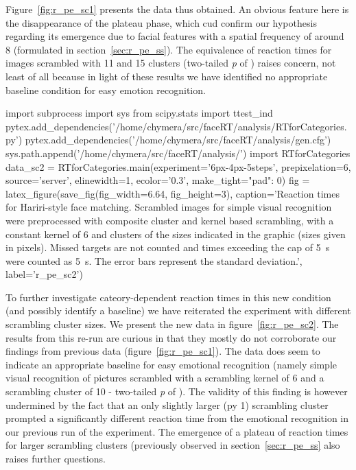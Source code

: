 	    Figure~\ref{fig:r_pe_sc1} presents the data thus obtained.
	    An obvious feature here is the disappearance of the plateau phase, which cud confirm our hypothesis regarding its emergence due to facial features with a spatial frequency of around \SI{8}{\pixel} (formulated in section~\ref{sec:r_pe_ss}).
	    The equivalence of reaction times for images scrambled with \SI{11}{\pixel} and \SI{15}{\pixel} clusters (two-tailed \textit{p} of ) raises concern, not least of all because in light of these results we have identified no appropriate baseline condition for easy emotion recognition.
	    \begin{pycode}
		import subprocess
		import sys
		from scipy.stats import ttest_ind
		pytex.add_dependencies('/home/chymera/src/faceRT/analysis/RTforCategories.py')
		pytex.add_dependencies('/home/chymera/src/faceRT/analysis/gen.cfg')
		sys.path.append('/home/chymera/src/faceRT/analysis/')
		import RTforCategories
		data_sc2 = RTforCategories.main(experiment='6px-4px-5steps', prepixelation=6, source='server', elinewidth=1, ecolor='0.3', make_tight={"pad": 0})
		fig = latex_figure(save_fig(fig_width=6.64, fig_height=3), caption='Reaction times for Hariri-style face matching. Scrambled images for simple visual recognition were preprocessed with composite cluster and kernel based scrambling, with a constant kernel of \SI{6}{\pixel} and clusters of the sizes indicated in the graphic (sizes given in pixels). Missed targets are not counted and times exceeding the cap of \SI{5}{\second} were counted as \SI{5}{\second}. The error bars represent the standard deviation.', label='r_pe_sc2')
	    \end{pycode}
	    
	    To further investigate cateory-dependent reaction times in this new condition (and possibly identify a baseline) we have reiterated the experiment with different scrambling cluster sizes.
	    We present the new data in figure~\ref{fig:r_pe_sc2}.
	    The results from this re-run are curious in that they mostly do not corroborate our findings from previous data (figure~\ref{fig:r_pe_sc1}).
	    The data does seem to indicate an appropriate baseline for easy emotional recognition (namely simple visual recognition of pictures scrambled with a scrambling kernel of \SI{6}{\pixel} and a scrambling cluster of \SI{10}{\pixel} - two-tailed \textit{p} of ).
	    The validity of this finding is however undermined by the fact that an only slightly larger (py \SI{1}{\pixel}) scrambling cluster prompted a significantly different reaction time from the emotional recognition in our previous run of the experiment.
	    The emergence of a plateau of reaction times for larger scrambling clusters (previously observed in section~\ref{sec:r_pe_ss} also raises further questions.
	    
